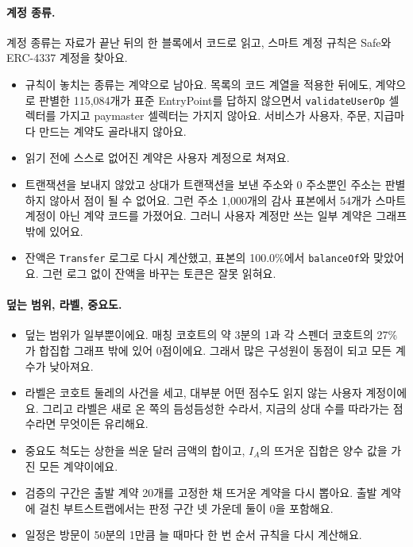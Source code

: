 \paragraph{계정 종류.}
계정 종류는 자료가 끝난 뒤의 한 블록에서 코드로 읽고, 스마트 계정 규칙은 Safe와 ERC-4337 계정을 찾아요.
\begin{itemize}
\item 규칙이 놓치는 종류는 계약으로 남아요. 목록의 코드 계열을 적용한 뒤에도, 계약으로 판별한 115,084개가 표준 EntryPoint를 답하지 않으면서 \texttt{validateUserOp} 셀렉터를 가지고 paymaster 셀렉터는 가지지 않아요. 서비스가 사용자, 주문, 지급마다 만드는 계약도 골라내지 않아요.
\item 읽기 전에 스스로 없어진 계약은 사용자 계정으로 쳐져요.
\item 트랜잭션을 보내지 않았고 상대가 트랜잭션을 보낸 주소와 0 주소뿐인 주소는 판별하지 않아서 점이 될 수 없어요. 그런 주소 1,000개의 감사 표본에서 54개가 스마트 계정이 아닌 계약 코드를 가졌어요. 그러니 사용자 계정만 쓰는 일부 계약은 그래프 밖에 있어요.
\item 잔액은 \texttt{Transfer} 로그로 다시 계산했고, 표본의 100.0\%에서 \texttt{balanceOf}와 맞았어요. 그런 로그 없이 잔액을 바꾸는 토큰은 잘못 읽혀요.
\end{itemize}

\paragraph{덮는 범위, 라벨, 중요도.}
\begin{itemize}
\item 덮는 범위가 일부뿐이에요. 매칭 코호트의 약 3분의 1과 각 스펜더 코호트의 27\%가 합집합 그래프 밖에 있어 0점이에요. 그래서 많은 구성원이 동점이 되고 모든 계수가 낮아져요.
\item 라벨은 코호트 둘레의 사건을 세고, 대부분 어떤 점수도 읽지 않는 사용자 계정이에요. 그리고 라벨은 새로 온 쪽의 듬성듬성한 수라서, 지금의 상대 수를 따라가는 점수라면 무엇이든 유리해요.
\item 중요도 척도는 상한을 씌운 달러 금액의 합이고, $I_A$의 뜨거운 집합은 양수 값을 가진 모든 계약이에요.
\item 검증의 구간은 출발 계약 20개를 고정한 채 뜨거운 계약을 다시 뽑아요. 출발 계약에 걸친 부트스트랩에서는 판정 구간 넷 가운데 둘이 0을 포함해요.
\item 일정은 방문이 50분의 1만큼 늘 때마다 한 번 순서 규칙을 다시 계산해요.
\end{itemize}

